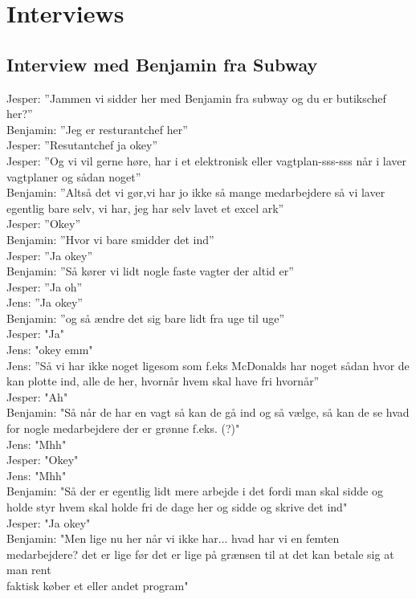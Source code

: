 \chapter{Interviews}
\section{Interview med Benjamin fra Subway}\label{app:subway}
Jesper: ”Jammen vi sidder her med Benjamin fra subway og du er butikschef her?”\\
Benjamin: ”Jeg er resturantchef her”\\
Jesper: ”Resutantchef ja okey”\\
Jesper: ”Og vi vil gerne høre, har i et elektronisk eller vagtplan-sss-sss når i laver vagtplaner og sådan noget”\\
Benjamin: ”Altså det vi gør,vi har jo ikke så mange medarbejdere så vi laver egentlig bare selv, vi har, jeg har selv lavet et excel ark”\\
Jesper: ”Okey”\\
Benjamin: ”Hvor vi bare smidder det ind”\\
Jesper: ”Ja okey”\\
Benjamin: ”Så kører vi lidt nogle faste vagter der altid er”\\
Jesper: ”Ja oh”\\
Jens: ”Ja okey”\\
Benjamin: ”og så ændre det sig bare lidt fra uge til uge”\\
Jesper: "Ja"\\
Jens: "okey emm"\\
Jens: ”Så vi har ikke noget ligesom som f.eks McDonalds har noget sådan hvor de kan plotte ind, alle de her, hvornår hvem skal have fri hvornår”\\
Jesper: "Ah"\\
Benjamin: "Så når de har en vagt så kan de gå ind og så vælge, så kan de se hvad for nogle medarbejdere der er grønne f.eks. (?)"\\
Jens: "Mhh"\\
Jesper: "Okey"\\
Jens: "Mhh"\\
Benjamin: "Så der er egentlig lidt mere arbejde i det fordi man skal sidde og holde styr hvem skal holde fri de dage her og sidde og skrive det ind"\\
Jesper: "Ja okey"\\
Benjamin: "Men lige nu her når vi ikke har... hvad har vi en femten medarbejdere? det er lige før det er lige på grænsen til at det kan betale sig at man rent\\ faktisk køber et eller andet program" \\
